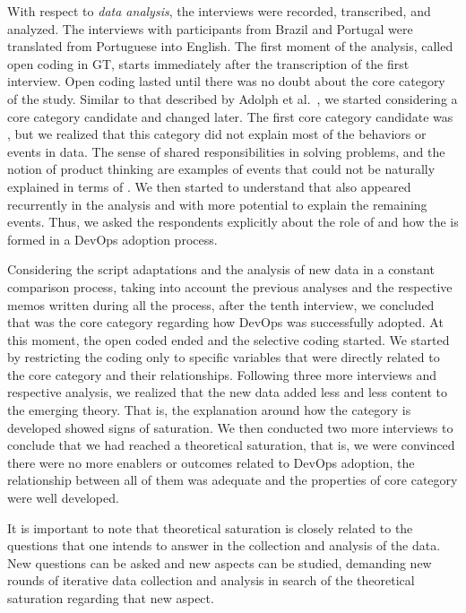 With respect to \emph{data analysis}, the interviews were
recorded, transcribed, and analyzed. The interviews with participants from
Brazil and Portugal were translated from Portuguese into
English. The first moment of the analysis, called open coding in GT, starts
immediately after the transcription of the first interview.
Open coding lasted until there was no
doubt about the core category of the study. Similar to that described by
Adolph et al.~\cite{adolph2012reconciling}, we started
considering a core category candidate and changed later. The first core category
candidate was , but we realized that this category did not
explain most of the behaviors or events in data. The sense of
shared responsibilities in solving problems, and the notion of product thinking
are examples of events that could not be naturally explained in terms of .
We then started to understand that \cc also appeared recurrently in the analysis
and with more potential to explain the remaining events. Thus, we asked the
respondents explicitly about the role of  and how the \cc is
formed in a DevOps adoption process.

Considering the script adaptations and the analysis of new data in a constant
comparison process, taking into account the previous analyses and the
respective memos written during all the process, after the tenth
interview, we concluded that \cc was the core
category regarding how DevOps was successfully adopted.
At this moment, the open coded ended and the selective coding started.
We started by restricting the coding only
to specific variables that were directly related to the core category and their
relationships. Following three more interviews and respective analysis, we realized that
the new data added less and less content to the emerging theory. That is, the
explanation around how the \cc category is developed showed signs of saturation.
We then conducted two more interviews to conclude that we had reached a
theoretical saturation, that is, we were convinced there were no more enablers
or outcomes related to DevOps adoption, the relationship between all of them
was adequate and the properties of core category were well developed.

{
\color{blue}
It is important to note that theoretical saturation is closely related to the
questions that one intends to answer in the collection and analysis of the data.
New questions can be asked and new aspects can be studied, demanding new rounds
of iterative data collection and analysis in search of the theoretical
saturation regarding that new aspect.
}

